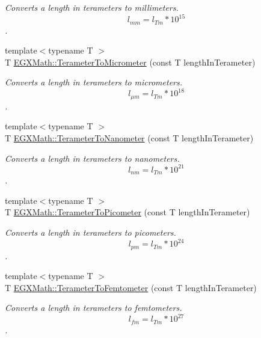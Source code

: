 \begin{DoxyCompactItemize}
\begin{DoxyCompactList}\small\item\em Converts a length in terameters to millimeters. \[ l_{mm}=l_{Tm} * 10^{15} \]. \end{DoxyCompactList}\item 
{\footnotesize template$<$typename T $>$ }\\T \mbox{\hyperlink{group___e_g_x_math-_conversions-_length_conversions-_terameter-_s_i_ga4f6fb943e4c16178f4060c01a9c00a02}{E\+G\+X\+Math\+::\+Terameter\+To\+Micrometer}} (const T length\+In\+Terameter)
\begin{DoxyCompactList}\small\item\em Converts a length in terameters to micrometers. \[ l_{\mu m}=l_{Tm} * 10^{18} \]. \end{DoxyCompactList}\item 
{\footnotesize template$<$typename T $>$ }\\T \mbox{\hyperlink{group___e_g_x_math-_conversions-_length_conversions-_terameter-_s_i_ga01da3f80c1d7cf73956140fa84ad615c}{E\+G\+X\+Math\+::\+Terameter\+To\+Nanometer}} (const T length\+In\+Terameter)
\begin{DoxyCompactList}\small\item\em Converts a length in terameters to nanometers. \[ l_{nm}=l_{Tm} * 10^{21} \]. \end{DoxyCompactList}\item 
{\footnotesize template$<$typename T $>$ }\\T \mbox{\hyperlink{group___e_g_x_math-_conversions-_length_conversions-_terameter-_s_i_ga131f3ccf4db05a31f5bd5c9487da9a4e}{E\+G\+X\+Math\+::\+Terameter\+To\+Picometer}} (const T length\+In\+Terameter)
\begin{DoxyCompactList}\small\item\em Converts a length in terameters to picometers. \[ l_{pm}=l_{Tm} * 10^{24} \]. \end{DoxyCompactList}\item 
{\footnotesize template$<$typename T $>$ }\\T \mbox{\hyperlink{group___e_g_x_math-_conversions-_length_conversions-_terameter-_s_i_ga3baa4e53ebd4305bc80d9b998720eba5}{E\+G\+X\+Math\+::\+Terameter\+To\+Femtometer}} (const T length\+In\+Terameter)
\begin{DoxyCompactList}\small\item\em Converts a length in terameters to femtometers. \[ l_{fm}=l_{Tm} * 10^{27} \]. \end{DoxyCompactList}\item 

\end{DoxyCompactItemize}
